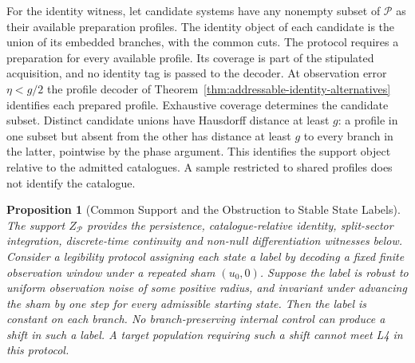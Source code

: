 \documentclass[11pt,a4paper]{article}
\newtheorem{proposition}[theorem]{Proposition}
\theoremstyle{definition}
\begin{document}
For the identity witness, let candidate systems have any nonempty subset of $\mathcal P$ as their available preparation profiles. The identity object of each candidate is the union of its embedded branches, with the common cuts. The protocol requires a preparation for every available profile. Its coverage is part of the stipulated acquisition, and no identity tag is passed to the decoder. At observation error $\eta<g/2$ the profile decoder of Theorem~\ref{thm:addressable-identity-alternatives} identifies each prepared profile. Exhaustive coverage determines the candidate subset. Distinct candidate unions have Hausdorff distance at least $g$: a profile in one subset but absent from the other has distance at least $g$ to every branch in the latter, pointwise by the phase argument. This identifies the support object relative to the admitted catalogues. A sample restricted to shared profiles does not identify the catalogue.

\begin{proposition}[Common Support and the Obstruction to Stable State Labels]\label{prop:common-support-sham-obstruction}
The support $Z_{\mathcal P}$ provides the persistence, catalogue-relative identity, split-sector integration, discrete-time continuity and non-null differentiation witnesses below. Consider a legibility protocol assigning each state a label by decoding a fixed finite observation window under a repeated sham $(u_0,0)$. Suppose the label is robust to uniform observation noise of some positive radius, and invariant under advancing the sham by one step for every admissible starting state. Then the label is constant on each branch. No branch-preserving internal control can produce a shift in such a label. A target population requiring such a shift cannot meet L4 in this protocol.
\end{proposition}
\end{document}
